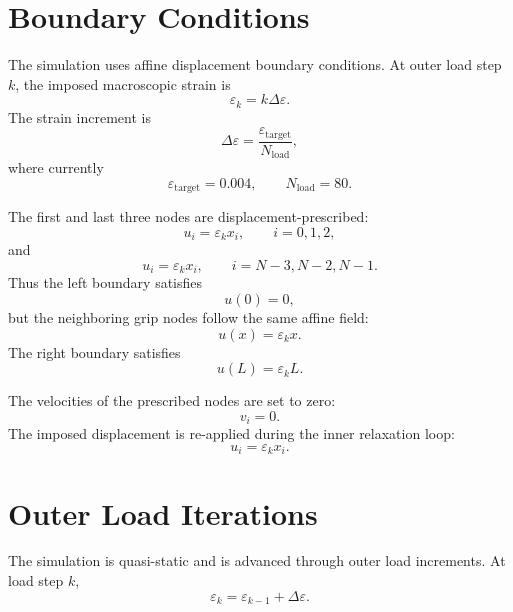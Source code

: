 \documentclass[11pt]{article}
\begin{document}
\section{Boundary Conditions}

The simulation uses affine displacement boundary conditions. At outer load step \(k\), the imposed macroscopic strain is
\begin{equation}
\varepsilon_k = k\Delta\varepsilon.
\end{equation}
The strain increment is
\begin{equation}
\Delta\varepsilon
=
\frac{\varepsilon_{\mathrm{target}}}{N_{\mathrm{load}}},
\end{equation}
where currently
\begin{equation}
\varepsilon_{\mathrm{target}} = 0.004,
\qquad
N_{\mathrm{load}} = 80.
\end{equation}

The first and last three nodes are displacement-prescribed:
\begin{equation}
u_i = \varepsilon_k x_i,
\qquad
i=0,1,2,
\end{equation}
and
\begin{equation}
u_i = \varepsilon_k x_i,
\qquad
i=N-3,N-2,N-1.
\end{equation}
Thus the left boundary satisfies
\begin{equation}
u(0)=0,
\end{equation}
but the neighboring grip nodes follow the same affine field:
\begin{equation}
u(x)=\varepsilon_k x.
\end{equation}
The right boundary satisfies
\begin{equation}
u(L)=\varepsilon_k L.
\end{equation}

The velocities of the prescribed nodes are set to zero:
\begin{equation}
v_i = 0.
\end{equation}
The imposed displacement is re-applied during the inner relaxation loop:
\begin{equation}
u_i = \varepsilon_k x_i.
\end{equation}

\section{Outer Load Iterations}

The simulation is quasi-static and is advanced through outer load increments. At load step \(k\),
\begin{equation}
\varepsilon_k
=
\varepsilon_{k-1}
+
\Delta\varepsilon.
\end{equation}
\end{document}
